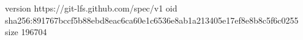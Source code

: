version https://git-lfs.github.com/spec/v1
oid sha256:891767bccf5b88ebd8eac6ca60e1c6536e8ab1a213405e17ef8e8b8c5f6c0255
size 196704
